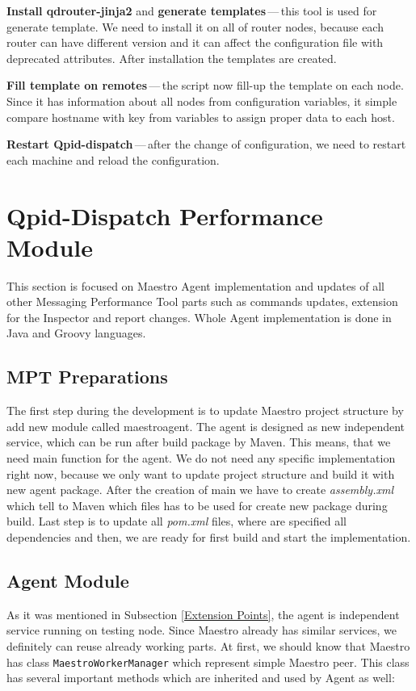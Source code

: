 \begin{description}
	\item \textbf{Install qdrouter-jinja2} and \textbf{generate templates}\,---\,this tool is used for generate template. We need to install it on all of router nodes, because each router can have different version and it can affect the configuration file with deprecated attributes. After installation the templates are created.
	\item \textbf{Fill template on remotes}\,---\,the script now fill-up the template on each node. Since it has information about all nodes from configuration variables, it simple compare hostname with key from variables to assign proper data to each host.
	\item \textbf{Restart Qpid-dispatch}\,---\,after the change of configuration, we need to restart each machine and reload the configuration.
\end{description}

\section{Qpid-Dispatch Performance Module}
This section is focused on Maestro Agent implementation and updates of all other Messaging Performance Tool parts such as commands updates, extension for the Inspector and report changes. Whole Agent implementation is done in Java and Groovy languages.

\subsection{MPT Preparations}
\label{MPT Preparations}
The first step during the development is to update Maestro project structure by add new module called maestro\-agent. The agent is designed as new independent service, which can be run after build package by Maven. This means, that we need main function for the agent. We do not need any specific implementation right now, because we only want to update project structure and build it with new agent package. After the creation of main we have to create \emph{assembly.xml} which tell to Maven which files has to be used for create new package during build. Last step is to update all \emph{pom.xml} files, where are specified all dependencies and then, we are ready for first build and start the implementation.

\subsection{Agent Module}
As it was mentioned in Subsection \ref{Extension Points}, the agent is independent service running on testing node. Since Maestro already has similar services, we definitely can reuse already working parts. At first, we should know that Maestro has class \texttt{MaestroWorkerManager} which represent simple Maestro peer. This class has several important methods which are inherited and used by Agent as well:

